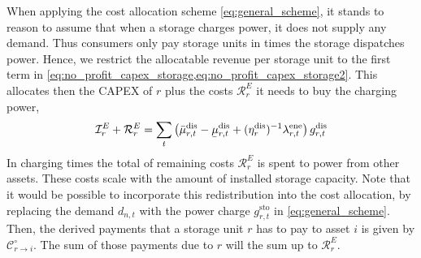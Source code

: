 \documentclass[11pt,twocolumn]{article}
\newcommand{\ubar}[1]{\underaccent{\bar}{#1}}
\newcommand{\pdv}[2]{\frac{\partial #1}{\partial #2}}
\newcommand{\storage}{g_{r,t}}
\newcommand{\storagedispatch}{\storage^\text{dis}}
\newcommand{\storagecharge}{\storage^\text{sto}}
\newcommand{\storagesoc}{\storage^\text{ene}}
\newcommand{\efficiency}{\eta_{r}}
\newcommand{\efficiencydispatch}{\efficiency^\text{dis}}
\newcommand{\efficiencycharge}{\efficiency^\text{sto}}
\newcommand{\efficiencysoc}{\efficiency^\text{ene}}
\newcommand{\operationalpricestorage}{o_r}
\newcommand{\mulowerstoragedispatch}{\ubar{\mu}_{r,t}^\text{dis}}
\newcommand{\muupperstoragedispatch}{\bar{\mu}_{r,t}^\text{dis}}
\newcommand{\mulowerstoragecharge}{\ubar{\mu}_{r,t}^\text{sto}}
\newcommand{\muupperstoragecharge}{\bar{\mu}_{r,t}^\text{sto}}
\newcommand{\mulowerstoragesoc}{\ubar{\mu}_{r,t}^\text{ene}}
\newcommand{\muupperstoragesoc}{\bar{\mu}_{r,t}^\text{ene}}
\newcommand{\mustateofcharge}{\lambda^\text{ene}_{r,t}}
\newcommand{\munextstateofcharge}{\lambda^\text{ene}_{r,t+1}}
\newcommand{\lagrangian}{\mathcal{L}}
\newcommand{\lmp}[1][n]{\lambda_{#1,t}}
\newcommand{\demand}[1][n]{d_{#1,t}}
\newcommand{\cost}[1][\circ]{\mathcal{C}^{#1}}
\newcommand{\capexstorage}{\mathcal{I}^E}
\newcommand{\remainingcost}{\mathcal{R}}
\begin{document}


When applying the cost allocation scheme \cref{eq:general_scheme}, it stands to reason to assume that when a storage charges power, it does not supply any demand. Thus consumers only pay storage units in times the storage dispatches power. Hence, we restrict the allocatable revenue per storage unit to the first term in \cref{eq:no_profit_capex_storage,eq:no_profit_capex_storage2}. This allocates then the CAPEX of $r$ plus the costs $\remainingcost^E_r$ it needs to buy the charging power, 
\begin{align}
        \capexstorage_r + \remainingcost^E_r = \sum_t \left(\muupperstoragedispatch - \mulowerstoragedispatch  + (\efficiencydispatch )^{-1} \mustateofcharge \right) \storagedispatch 
\end{align} 
In charging times the total of remaining costs $\remainingcost^E_r$ is spent to power from other assets. These costs scale with the amount of installed storage capacity.
Note that it would be possible to incorporate this redistribution into the cost allocation, by replacing the demand $\demand$ with the power charge $\storagecharge$ in \cref{eq:general_scheme}. Then, the derived payments that a storage unit $r$ has to pay to asset $i$ is given by $\cost_{r \rightarrow i}$. The sum of those payments due to $r$ will the sum up to $\remainingcost^E_r$. 
\end{document}
